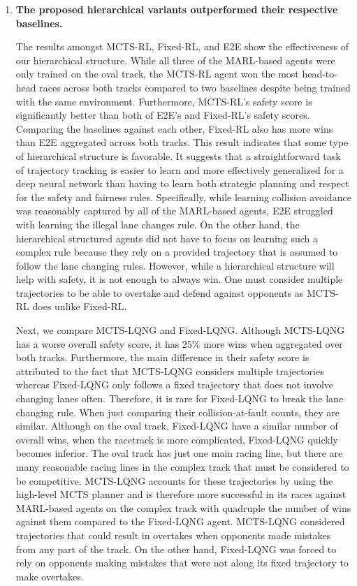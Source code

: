 \begin{enumerate}[wide, labelindent=0pt, font=\bfseries]
\item \textbf{The proposed hierarchical variants outperformed their respective baselines.} 

The results amongst MCTS-RL, Fixed-RL, and E2E show the effectiveness of our hierarchical structure. While all three of the MARL-based agents were only trained on the oval track, the MCTS-RL agent won the most head-to-head races across both tracks compared to two baselines despite being trained with the same environment. Furthermore, MCTS-RL's safety score is significantly better than both of E2E's and Fixed-RL's safety scores. Comparing the baselines against each other, Fixed-RL also has more wins than E2E aggregated across both tracks. This result indicates that some type of hierarchical structure is favorable. It suggests that a straightforward task of trajectory tracking is easier to learn and more effectively generalized for a deep neural network than having to learn both strategic planning and respect for the safety and fairness rules. Specifically, while learning collision avoidance was reasonably captured by all of the MARL-based agents, E2E struggled with learning the illegal lane changes rule. On the other hand, the hierarchical structured agents did not have to focus on learning such a complex rule because they rely on a provided trajectory that is assumed to follow the lane changing rules. However, while a hierarchical structure will help with safety, it is not enough to always win. One must consider multiple trajectories to be able to overtake and defend against opponents as MCTS-RL does unlike Fixed-RL.

Next, we compare MCTS-LQNG and Fixed-LQNG. Although MCTS-LQNG has a worse overall safety score, it has 25\% more wins when aggregated over both tracks. Furthermore, the main difference in their safety score is attributed to the fact that MCTS-LQNG considers multiple trajectories whereas Fixed-LQNG only follows a fixed trajectory that does not involve changing lanes often. Therefore, it is rare for Fixed-LQNG to break the lane changing rule. When just comparing their collision-at-fault counts, they are similar. Although on the oval track, Fixed-LQNG have a similar number of overall wins, when the racetrack is more complicated, Fixed-LQNG quickly becomes inferior. The oval track has just one main racing line, but there are many reasonable racing lines in the complex track that must be considered to be competitive. MCTS-LQNG accounts for these trajectories by using the high-level MCTS planner and is therefore more successful in its races against MARL-based agents on the complex track with quadruple the number of wins against them compared to the Fixed-LQNG agent. MCTS-LQNG considered trajectories that could result in overtakes when opponents made mistakes from any part of the track. On the other hand, Fixed-LQNG was forced to rely on opponents making mistakes that were not along its fixed trajectory to make overtakes. 


\end{enumerate}
